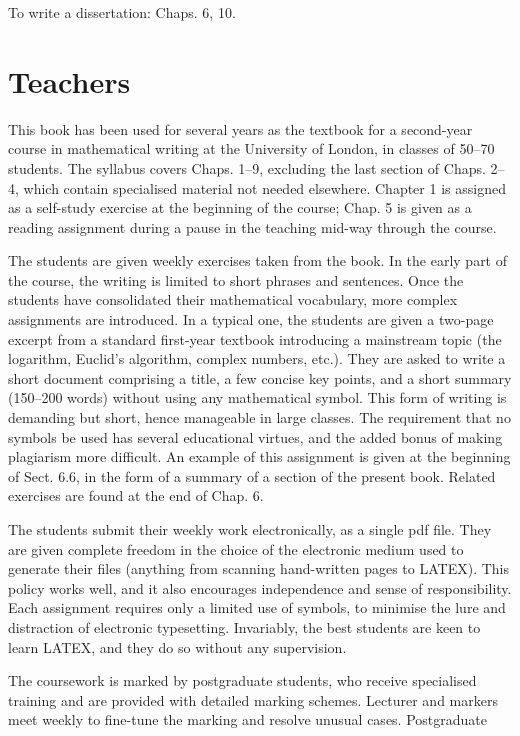 \documentclass[11pt]{article}
\theoremstyle{plain}
\theoremstyle{definition}
\begin{document}
\textbullet{} To write a dissertation: Chaps. 6, 10.

\section{Teachers}

This book has been used for several years as the textbook for a second-year course in mathematical writing at the University of London, in classes of 50--70 students. The syllabus covers Chaps. 1--9, excluding the last section of Chaps. 2--4, which contain specialised material not needed elsewhere. Chapter 1 is assigned as a self-study exercise at the beginning of the course; Chap. 5 is given as a reading assignment during a pause in the teaching mid-way through the course.

The students are given weekly exercises taken from the book. In the early part of the course, the writing is limited to short phrases and sentences. Once the students have consolidated their mathematical vocabulary, more complex assignments are introduced. In a typical one, the students are given a two-page excerpt from a standard first-year textbook introducing a mainstream topic (the logarithm, Euclid's algorithm, complex numbers, etc.). They are asked to write a short document comprising a title, a few concise key points, and a short summary (150--200 words) without using any mathematical symbol. This form of writing is demanding but short, hence manageable in large classes. The requirement that no symbols be used has several educational virtues, and the added bonus of making plagiarism more difficult. An example of this assignment is given at the beginning of Sect. 6.6, in the form of a summary of a section of the present book. Related exercises are found at the end of Chap. 6.

The students submit their weekly work electronically, as a single pdf file. They are given complete freedom in the choice of the electronic medium used to generate their files (anything from scanning hand-written pages to LATEX). This policy works well, and it also encourages independence and sense of responsibility. Each assignment requires only a limited use of symbols, to minimise the lure and distraction of electronic typesetting. Invariably, the best students are keen to learn LATEX, and they do so without any supervision.

The coursework is marked by postgraduate students, who receive specialised training and are provided with detailed marking schemes. Lecturer and markers meet weekly to fine-tune the marking and resolve unusual cases. Postgraduate
\end{document}
